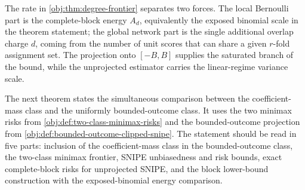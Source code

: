 \documentclass[11pt]{article}
\begin{document}
The rate in \cref{obj:thm:degree-frontier} separates two forces. The local Bernoulli part is the complete-block energy \(A_d\), equivalently the exposed binomial scale in the theorem statement; the global network part is the single additional overlap charge \(d\), coming from the number of unit scores that can share a given \(r\)-fold assignment set. The projection onto \([-B,B]\) supplies the saturated branch of the bound, while the unprojected estimator carries the linear-regime variance scale.

The next theorem states the simultaneous comparison between the coefficient-mass class and the uniformly bounded-outcome class. It uses the two minimax risks from \cref{obj:def:two-class-minimax-risks} and the bounded-outcome projection from \cref{obj:def:bounded-outcome-clipped-snipe}. The statement should be read in five parts: inclusion of the coefficient-mass class in the bounded-outcome class, the two-class minimax frontier, SNIPE unbiasedness and risk bounds, exact complete-block risks for unprojected SNIPE, and the block lower-bound construction with the exposed-binomial energy comparison.
\end{document}
